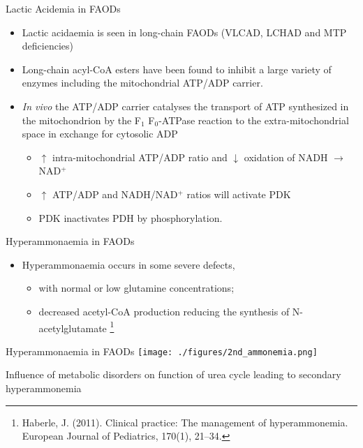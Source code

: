 \documentclass[presentation, smaller]{beamer}
\begin{document}
\begin{frame}[label={sec:orgheadline15}]{Lactic Acidemia in FAODs}
\begin{itemize}
\item Lactic acidaemia is seen in long-chain FAODs (VLCAD, LCHAD and MTP deficiencies)
\item Long-chain acyl-CoA esters have been found to inhibit a large
variety of enzymes including the mitochondrial ATP/ADP carrier.

\item \emph{In vivo} the ATP/ADP carrier catalyses the transport of ATP
synthesized in the mitochondrion by the F\(_{\text{1}}\) F\(_{\text{0}}\)-ATPase reaction to the
extra-mitochondrial space in exchange for cytosolic ADP
\begin{itemize}
\item \(\uparrow\) intra-mitochondrial ATP/ADP ratio and \(\downarrow\) oxidation of
NADH \(\to\) NAD\(^{\text{+}}\)
\item \(\uparrow\) ATP/ADP and NADH/NAD\(^{\text{+}}\) ratios will activate PDK
\item PDK inactivates PDH by phosphorylation.
\end{itemize}
\end{itemize}
\end{frame}

\begin{frame}[label={sec:orgheadline16}]{Hyperammonaemia in FAODs}
\begin{itemize}
\item Hyperammonaemia occurs in some severe defects,
\begin{itemize}
\item with normal or low glutamine concentrations;
\item decreased acetyl-CoA production reducing the synthesis of N-acetylglutamate \footnote{Haberle, J. (2011). Clinical practice: The management of
hyperammonemia. European Journal of Pediatrics, 170(1), 21–34.}
\end{itemize}
\end{itemize}
\end{frame}

\begin{frame}[label={sec:orgheadline17}]{Hyperammonaemia in FAODs}
\texttt{[image: ./figures/2nd\_ammonemia.png]}

\tiny
Influence of metabolic disorders on function of urea cycle leading to secondary hyperammonemia
\end{frame}
\end{document}
